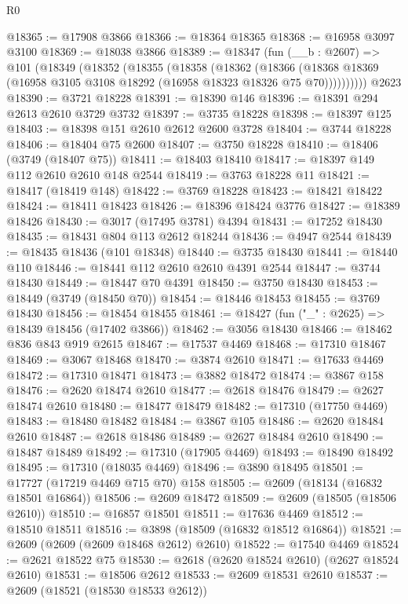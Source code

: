 \begin{lexlean}{R0}
\begin{coremodule}
@18365 := @17908 @3866
@18366 := @18364 @18365
@18368 := @16958 @3097 @3100
@18369 := @18038 @3866
@18389 := @18347
    (fun (__b : @2607) =>
    @101
      (@18349
        (@18352
          (@18355
            (@18358
              (@18362
                (@18366
                  (@18368 @18369 (@16958 @3105 @3108 @18292 (@16958 @18323 @18326 @75 @70))))))))))
    @2623
@18390 := @3721 @18228
@18391 := @18390 @146
@18396 := @18391 @294 @2613 @2610 @3729 @3732
@18397 := @3735 @18228
@18398 := @18397 @125
@18403 := @18398 @151 @2610 @2612 @2600 @3728
@18404 := @3744 @18228
@18406 := @18404 @75 @2600
@18407 := @3750 @18228
@18410 := @18406 (@3749 (@18407 @75))
@18411 := @18403 @18410
@18417 := @18397 @149 @112 @2610 @2610 @148 @2544
@18419 := @3763 @18228 @11
@18421 := @18417 (@18419 @148)
@18422 := @3769 @18228
@18423 := @18421 @18422
@18424 := @18411 @18423
@18426 := @18396 @18424 @3776
@18427 := @18389 @18426
@18430 := @3017 (@17495 @3781) @4394
@18431 := @17252 @18430
@18435 := @18431 @804 @113 @2612 @18244
@18436 := @4947 @2544
@18439 := @18435 @18436 (@101 @18348)
@18440 := @3735 @18430
@18441 := @18440 @110
@18446 := @18441 @112 @2610 @2610 @4391 @2544
@18447 := @3744 @18430
@18449 := @18447 @70 @4391
@18450 := @3750 @18430
@18453 := @18449 (@3749 (@18450 @70))
@18454 := @18446 @18453
@18455 := @3769 @18430
@18456 := @18454 @18455
@18461 := @18427 (fun ("_" : @2625) => @18439 @18456 (@17402 @3866))
@18462 := @3056 @18430
@18466 := @18462 @836 @843 @919 @2615
@18467 := @17537 @4469
@18468 := @17310 @18467
@18469 := @3067 @18468
@18470 := @3874 @2610
@18471 := @17633 @4469
@18472 := @17310 @18471
@18473 := @3882 @18472
@18474 := @3867 @158
@18476 := @2620 @18474 @2610
@18477 := @2618 @18476
@18479 := @2627 @18474 @2610
@18480 := @18477 @18479
@18482 := @17310 (@17750 @4469)
@18483 := @18480 @18482
@18484 := @3867 @105
@18486 := @2620 @18484 @2610
@18487 := @2618 @18486
@18489 := @2627 @18484 @2610
@18490 := @18487 @18489
@18492 := @17310 (@17905 @4469)
@18493 := @18490 @18492
@18495 := @17310 (@18035 @4469)
@18496 := @3890 @18495
@18501 := @17727 (@17219 @4469 @715 @70) @158
@18505 := @2609 (@18134 (@16832 @18501 @16864))
@18506 := @2609 @18472
@18509 := @2609 (@18505 (@18506 @2610))
@18510 := @16857 @18501
@18511 := @17636 @4469
@18512 := @18510 @18511
@18516 := @3898 (@18509 (@16832 @18512 @16864))
@18521 := @2609 (@2609 (@2609 @18468 @2612) @2610)
@18522 := @17540 @4469
@18524 := @2621 @18522 @75
@18530 := @2618 (@2620 @18524 @2610) (@2627 @18524 @2610)
@18531 := @18506 @2612
@18533 := @2609 @18531 @2610
@18537 := @2609 (@18521 (@18530 @18533 @2612))

\end{coremodule}
\end{lexlean}
